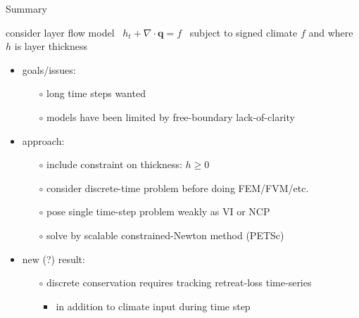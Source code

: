 \documentclass{beamer}
\newcommand\bq{\mathbf{q}}
\newcommand{\Div}{\nabla\cdot}
\begin{document}
\begin{frame}{Summary}

consider layer flow model \, $h_t + \Div\bq = f$ \, subject to signed climate $f$ and where $h$ is layer thickness

  \begin{itemize}
  \item goals/issues:
    \begin{itemize}
    \item[$\circ$]  long time steps wanted
    \item[$\circ$]  models have been limited by free-boundary lack-of-clarity
    \end{itemize}
  \item approach:
    \begin{itemize}
    \item[$\circ$]  include constraint on thickness: $h\ge 0$
    \item[$\circ$]  consider discrete-time problem before doing FEM/FVM/etc.
    \item[$\circ$]  pose single time-step problem weakly as VI or NCP
    \item[$\circ$]  solve by scalable constrained-Newton method (PETSc)
    \end{itemize}
  \item new (?) result:
    \begin{itemize}
    \item[$\circ$]  discrete conservation requires tracking retreat-loss time-series
      \begin{itemize}
      \item in addition to climate input during time step
      \end{itemize}
    \end{itemize}
  \end{itemize}

\end{frame}
\end{document}
